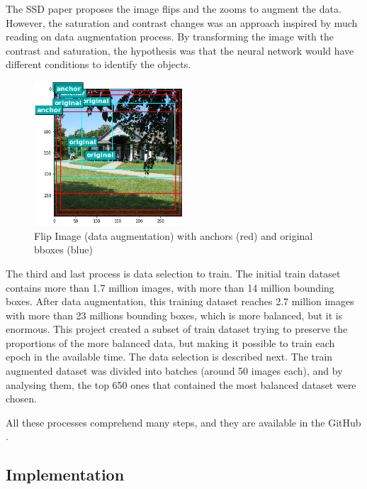 \documentclass[11pt, a4paper, twocolumn]{article}
\begin{document}
The SSD paper proposes the image flips and the zooms to augment the data. However, the saturation and contrast changes was an approach inspired by much reading on data augmentation process. By transforming the image with the contrast and saturation, the hypothesis was that the neural network would have different conditions to identify the objects. 

\begin{figure}[!ht]
	\centering
	\includegraphics[width=0.5\textwidth]{flip-data-aug.png}
	\caption{\scriptsize Flip Image (data augmentation) with anchors (red) and original bboxes (blue)}
\end{figure}

The third and last process is data selection to train. The initial train dataset contains more than 1.7 million images, with more than 14 million bounding boxes. After data augmentation, this training dataset reaches 2.7 million images with more than 23 millions bounding boxes, which is more balanced, but it is enormous. This project created a subset of train dataset trying to preserve the proportions of the more balanced data, but making it possible to train each epoch in the available time. The data selection is described next. The train augmented dataset was divided into batches (around 50 images each), and by analysing them, the top 650 ones that contained the most balanced dataset were chosen.

All these processes comprehend many steps, and they are available in the GitHub \cite{balmeidas}.
\subsection{Implementation}
\end{document}
